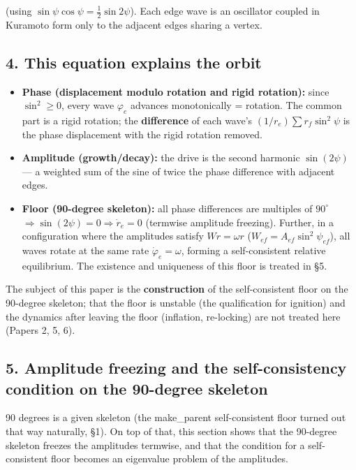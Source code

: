 \documentclass[
  a4paper,
]{ltjsarticle}
\providecommand{\tightlist}{%
  \setlength{\itemsep}{0pt}\setlength{\parskip}{0pt}}
\begin{document}
(using \(\sin\psi\cos\psi=\tfrac12\sin2\psi\)). Each edge wave is an
oscillator coupled in Kuramoto form only to the adjacent edges sharing a
vertex.

\subsection{4. This equation explains the
orbit}\label{this-equation-explains-the-orbit}

\begin{itemize}
\tightlist
\item
  \textbf{Phase (displacement modulo rotation and rigid rotation):}
  since \(\sin^2\ge0\), every wave \(\varphi_e\) advances monotonically
  = rotation. The common part is a rigid rotation; the
  \textbf{difference} of each wave's \((1/r_e)\sum r_f\sin^2\psi\) is
  the phase displacement with the rigid rotation removed.
\item
  \textbf{Amplitude (growth/decay):} the drive is the second harmonic
  \(\sin(2\psi)\) --- a weighted sum of the sine of twice the phase
  difference with adjacent edges.
\item
  \textbf{Floor (90-degree skeleton):} all phase differences are
  multiples of \(90^\circ\)
  \(\Rightarrow\sin(2\psi)=0\Rightarrow\dot r_e=0\) (termwise amplitude
  freezing). Further, in a configuration where the amplitudes satisfy
  \(Wr=\omega r\) (\(W_{ef}=A_{ef}\sin^2\psi_{ef}\)), all waves rotate
  at the same rate \(\dot\varphi_e=\omega\), forming a self-consistent
  relative equilibrium. The existence and uniqueness of this floor is
  treated in §5.
\end{itemize}

The subject of this paper is the \textbf{construction} of the
self-consistent floor on the 90-degree skeleton; that the floor is
unstable (the qualification for ignition) and the dynamics after leaving
the floor (inflation, re-locking) are not treated here (Papers 2, 5, 6).

\subsection{5. Amplitude freezing and the self-consistency condition on
the 90-degree
skeleton}\label{amplitude-freezing-and-the-self-consistency-condition-on-the-90-degree-skeleton}

90 degrees is a given skeleton (the make\_parent self-consistent floor
turned out that way naturally, §1). On top of that, this section shows
that the 90-degree skeleton freezes the amplitudes termwise, and that
the condition for a self-consistent floor becomes an eigenvalue problem
of the amplitudes.
\end{document}

